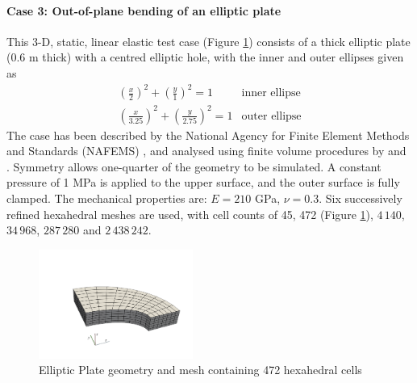 \documentclass[sn-mathphys,Numbered]{sn-jnl}%
\begin{document}
\paragraph{Case 3: Out-of-plane bending of an elliptic plate}
This 3-D, static, linear elastic test case (Figure \ref{fig:elliptic_plate}) consists of a thick elliptic plate (0.6 m thick) with a centred elliptic hole, with the inner and outer ellipses given as
\begin{eqnarray}
	\left(\frac{x}{2}\right)^2 + \left(\frac{y}{1}\right)^2 = 1 & \text{inner ellipse} \\
	\left(\frac{x}{3.25}\right)^2 + \left(\frac{y}{2.75}\right)^2 = 1 & \text{outer ellipse}
\end{eqnarray}
The case has been described by the National Agency for Finite Element Methods and Standards (NAFEMS) \cite{Hitchings1987}, and analysed using finite volume procedures by \citet{Demirdzic1997a} and \citet{Cardiff2016a}.
Symmetry allows one-quarter of the geometry to be simulated.
A constant pressure of 1 MPa is applied to the upper surface, and the outer surface is fully clamped.
The mechanical properties are: $E = 210$ GPa, $\nu = 0.3$.
Six successively refined hexahedral meshes are used, with cell counts of 45, 472 (Figure \ref{fig:elliptic_plate}), $4\,140$, $34\,968$, $287\,280$ and $2\,438\,242$.
\begin{figure}[htbp]
   \centering
		\includegraphics[width=0.45\textwidth]{figures/elliptic_plate.pdf} 
   \caption{Elliptic Plate geometry and mesh containing 472 hexahedral cells}
   \label{fig:elliptic_plate}
\end{figure}
\end{document}
